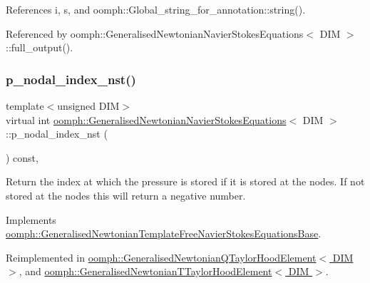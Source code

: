 References i, s, and oomph\+::\+Global\+\_\+string\+\_\+for\+\_\+annotation\+::string().



Referenced by oomph\+::\+Generalised\+Newtonian\+Navier\+Stokes\+Equations$<$ D\+I\+M $>$\+::full\+\_\+output().

\mbox{\label{classoomph_1_1GeneralisedNewtonianNavierStokesEquations_aae2c43cb69c84108e838b5aec8bd2a4b}} 
\subsubsection{\texorpdfstring{p\+\_\+nodal\+\_\+index\+\_\+nst()}{p\_nodal\_index\_nst()}}
{\footnotesize\ttfamily template$<$unsigned D\+IM$>$ \\
virtual int \hyperlink{classoomph_1_1GeneralisedNewtonianNavierStokesEquations}{oomph\+::\+Generalised\+Newtonian\+Navier\+Stokes\+Equations}$<$ D\+IM $>$\+::p\+\_\+nodal\+\_\+index\+\_\+nst (\begin{DoxyParamCaption}{ }\end{DoxyParamCaption}) const\hspace{0.3cm}{\ttfamily [inline]}, {\ttfamily [virtual]}}



Return the index at which the pressure is stored if it is stored at the nodes. If not stored at the nodes this will return a negative number. 



Implements \hyperlink{classoomph_1_1GeneralisedNewtonianTemplateFreeNavierStokesEquationsBase_a649186f26fbe7e3725a50c777a68008b}{oomph\+::\+Generalised\+Newtonian\+Template\+Free\+Navier\+Stokes\+Equations\+Base}.



Reimplemented in \hyperlink{classoomph_1_1GeneralisedNewtonianQTaylorHoodElement_a1100787d48487bdb1ca3201b49c9c41f}{oomph\+::\+Generalised\+Newtonian\+Q\+Taylor\+Hood\+Element$<$ D\+I\+M $>$}, and \hyperlink{classoomph_1_1GeneralisedNewtonianTTaylorHoodElement_af1aacc302260ae8d987bc48b560304f5}{oomph\+::\+Generalised\+Newtonian\+T\+Taylor\+Hood\+Element$<$ D\+I\+M $>$}.



